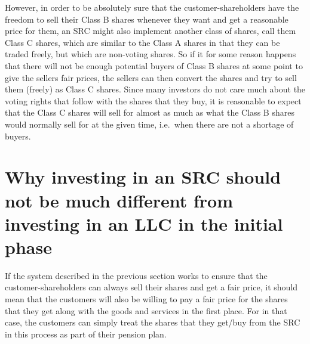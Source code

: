 \documentclass{article}
\begin{document}
However, in order to be absolutely sure that the customer-shareholders have the freedom to sell their Class B shares whenever they want and get a reasonable price for them, an SRC might also implement another class of shares, call them Class C shares, which are similar to the Class A shares in that they can be traded freely, but which are non-voting shares. So if it for some reason happens that there will not be enough potential buyers of Class B shares at some point to give the sellers fair prices, the sellers can then convert the shares and try to sell them (freely) as Class C shares. Since many investors do not care much about the voting rights that follow with the shares that they buy, it is reasonable to expect that the Class C shares will sell for almost as much as what the Class B shares would normally sell for at the given time, i.e.\ when there are not a shortage of buyers. 










\section{Why investing in an SRC should not be much different from investing in an LLC in the initial phase}
\label{sect_thesis}

If the system described in the previous section works to ensure that the customer-shareholders can always sell their shares and get a fair price, it should mean that the customers will also be willing to pay a fair price for the shares that they get along with the goods and services in the first place. For in that case, the customers can simply treat the shares that they get/buy from the SRC in this process as part of their pension plan. 
\end{document}
